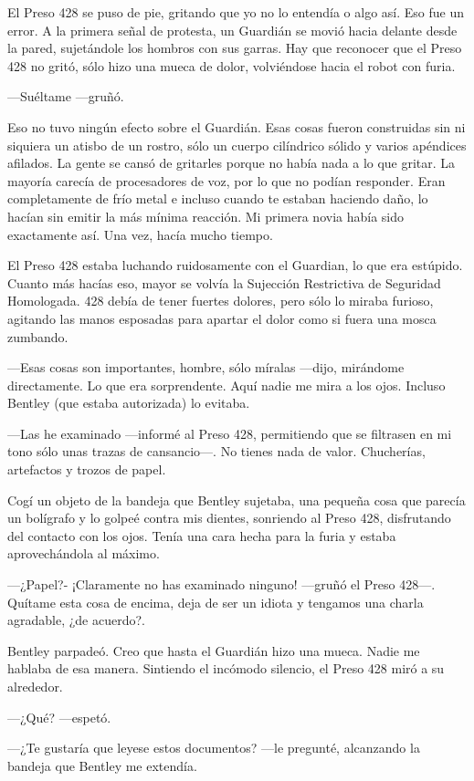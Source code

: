 El Preso 428 se puso de pie, gritando que yo no lo entendía o algo así.
Eso fue un error. A la primera señal de protesta, un Guardián se movió
hacia delante desde la pared, sujetándole los hombros con sus garras.
Hay que reconocer que el Preso 428 no gritó, sólo hizo una mueca de
dolor, volviéndose hacia el robot con furia.

---Suéltame ---gruñó.

Eso no tuvo ningún efecto sobre el Guardián. Esas cosas fueron
construidas sin ni siquiera un atisbo de un rostro, sólo un cuerpo
cilíndrico sólido y varios apéndices afilados. La gente se cansó de
gritarles porque no había nada a lo que gritar. La mayoría carecía de
procesadores de voz, por lo que no podían responder. Eran completamente
de frío metal e incluso cuando te estaban haciendo daño, lo hacían sin
emitir la más mínima reacción. Mi primera novia había sido exactamente
así. Una vez, hacía mucho tiempo.

El Preso 428 estaba luchando ruidosamente con el Guardian, lo que era
estúpido. Cuanto más hacías eso, mayor se volvía la Sujección
Restrictiva de Seguridad Homologada. 428 debía de tener fuertes dolores,
pero sólo lo miraba furioso, agitando las manos esposadas para apartar
el dolor como si fuera una mosca zumbando.

---Esas cosas son importantes, hombre, sólo míralas ---dijo, mirándome
directamente. Lo que era sorprendente. Aquí nadie me mira a los ojos.
Incluso Bentley (que estaba autorizada) lo evitaba.

---Las he examinado ---informé al Preso 428, permitiendo que se
filtrasen en mi tono sólo unas trazas de cansancio---. No tienes nada de
valor. Chucherías, artefactos y trozos de papel.

Cogí un objeto de la bandeja que Bentley sujetaba, una pequeña cosa que
parecía un bolígrafo y lo golpeé contra mis dientes, sonriendo al Preso
428, disfrutando del contacto con los ojos. Tenía una cara hecha para la
furia y estaba aprovechándola al máximo.

---¿Papel?- ¡Claramente no has examinado ninguno! ---gruñó el Preso
428---. Quítame esta cosa de encima, deja de ser un idiota y tengamos
una charla agradable, ¿de acuerdo?.

Bentley parpadeó. Creo que hasta el Guardián hizo una mueca. Nadie me
hablaba de esa manera. Sintiendo el incómodo silencio, el Preso 428 miró
a su alrededor.

---¿Qué? ---espetó.

---¿Te gustaría que leyese estos documentos? ---le pregunté, alcanzando
la bandeja que Bentley me extendía.

